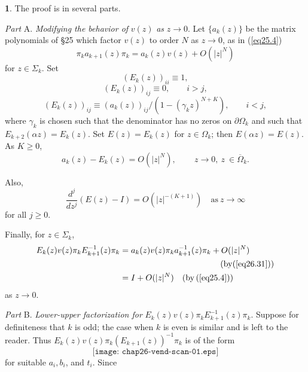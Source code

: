 \documentclass{surv-l}
\theoremstyle{plain}
\theoremstyle{definition}
\newtheorem*{pf}{\sc{Proof}}
\numberwithin{equation}{chapter}
\begin{document}
\begin{pf}
The proof is in several parts.

\emph{Part} A. \emph{Modifying the behavior of} $v(z)$ \emph{as} $z\rightarrow 0$. Let $\{a_{k}(z)\}$ be the matrix polynomials of \S25
which factor $v(z)$ to order $N$ as $z\rightarrow 0$, as in (\ref{eq25.4})
\begin{equation*}
\pi_{k}a_{k+1}(z)\pi_{k}=a_{k}(z)v(z)+O(|z|^{N})
\end{equation*}
for $z \in\Sigma_{k}$. Set
\begin{equation}\label{eq26.28}
(E_{k}(z))_{ii}\equiv 1,
\end{equation}
\begin{equation}\label{eq26.29}
(E_{k}(z))_{ij}\equiv 0,\qquad i>j,
\end{equation}
\begin{equation}\label{eq26.30}
(E_{k}(z))_{ij}\equiv(a_{k}(z))_{ij}/(1-(\gamma_{k}z)^{N+K}), \qquad i<j,
\end{equation}
where $\gamma_{k}$ is chosen such that the denominator has no zeros on $\partial\Omega_{k}$ and such that $E_{k+2}(\alpha z)=E_{k}(z)$. Set $E(z)=E_{k}(z)$ for $z\in\Omega_{k}$; then $E(\alpha z)=E(z)$. As $K\geq 0$,
\begin{equation}\label{eq26.31}
a_{k}(z)-E_{k}(z)=O(|z|^{N})\text{, } \qquad z\rightarrow 0,\ z\ \in\overline{\Omega}_{k}.
\end{equation}

Also,
\begin{equation}\label{eq26.32}
\frac{d^{j}}{dz^{j}}(E(z) -I)=O(|z|^{-(K+1)})\quad \mathrm{as}\  z\rightarrow\infty
\end{equation}
for all $j\geq 0$.

Finally, for $z\in\Sigma_{k}$,
\begin{align}\label{eq26.33}
E_{k}(z)v(z)\pi_{k}E_{k+1}^{-1}(z)\pi_{k}&=a_{k}(z)v(z)\pi_{k}a_{k+1}^{-1}(z)\pi_{k}+O(|z|^{N})\\ \nonumber
& \qquad \qquad\qquad \qquad\qquad \qquad (\mathrm{by} (\ref{eq26.31}))\\ \nonumber
&=I+O(|z|^{N})\quad  (\mathrm{by}\, (\ref{eq25.4})) \nonumber
\end{align}
as $z\rightarrow 0$.
\end{pf}
\emph{Part} B. \emph{Lower-upper factorization for} $E_{k}(z)v(z)\pi_{k}E_{k+1}^{-1}(z)\pi_{k}$. Suppose for definiteness that $k$ is odd; the case when $k$ is even is similar and is left to the reader. Thus $E_{k}(z)v(z)\pi_{k}(E_{k+1}(z))^{-1}\pi_{k}$ is of the form
\begin{equation*}
\texttt{[image: chap26-vend-scan-01.eps]}
\end{equation*}
for suitable $a_{i}, b_{i}$, and $t_{i}$. Since
\end{document}
